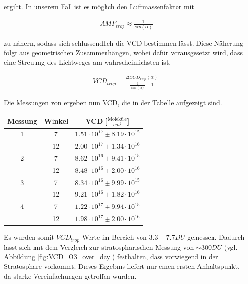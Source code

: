 \documentclass[12pt, a4paper, bibliography=totoc]{scrartcl}
\begin{document}
\begin{multicols}{2}
ergibt.
In unserem Fall ist es möglich den Luftmassenfaktor mit

\begin{align}
AMF_{trop} \approx \frac{1}{sin(\alpha)}
\end{align}

zu nähern, sodass sich schlussendlich die VCD bestimmen lässt. Diese Näherung folgt aus geometrischen Zusammenhängen, wobei dafür vorausgesetzt wird, dass eine Streuung des Lichtweges am wahrscheinlichsten ist. 

\begin{align}
VCD_{trop} = \frac{\Delta SCD_{trop}(\alpha)}{\frac{1}{\sin(\alpha)}-1}.
\end{align}

Die Messungen von  ergeben nun VCD, die in der Tabelle aufgezeigt sind.

\begin{center}
	
	\begin{tabular*}{\linewidth}{c c c}
		\toprule
		Messung & Winkel & VCD [$\frac{\text{Moleküle}}{\si{cm}^2}$] \\
		\midrule
		1 & 7 & $1.51 \cdot 10^{17} \pm 8.19 \cdot 10^{15}$  \\
		& 12 & $2.00 \cdot 10^{17} \pm 1.34 \cdot 10^{16}$\\
		2 & 7 & $8.62 \cdot 10^{16} \pm 9.41 \cdot 10^{15}$ \\
		& 12 & $8.48 \cdot 10^{16} \pm 2.00 \cdot 10^{16}$\\
		3 & 7 &  $8.34 \cdot 10^{16} \pm 9.99 \cdot 10^{15}$\\
		& 12 & $9.21 \cdot 10^{16} \pm 1.82 \cdot 10^{16}$\\
		4 & 7 & $1.22 \cdot 10^{17} \pm 9.94 \cdot 10^{15}$ \\
		& 12 & $1.98 \cdot 10^{17} \pm 2.00 \cdot 10^{16}$\\
		\bottomrule
	\end{tabular*}
	\label{fig:VCD_O3_trop}
\end{center}

Es wurden somit $VCD_{trop}$ Werte im Bereich von $3.3 - 7.7 \si{DU}$ gemessen. Dadurch lässt sich mit dem Vergleich zur stratosphärischen Messung von $\sim 300 \si{DU}$ (vgl. Abbildung \ref{fig:VCD_O3_over_day}) festhalten, dass  vorwiegend in der Stratosphäre vorkommt. Dieses Ergebnis liefert nur einen ersten Anhaltspunkt, da starke Vereinfachungen getroffen wurden.\\


\end{multicols}
\end{document}
